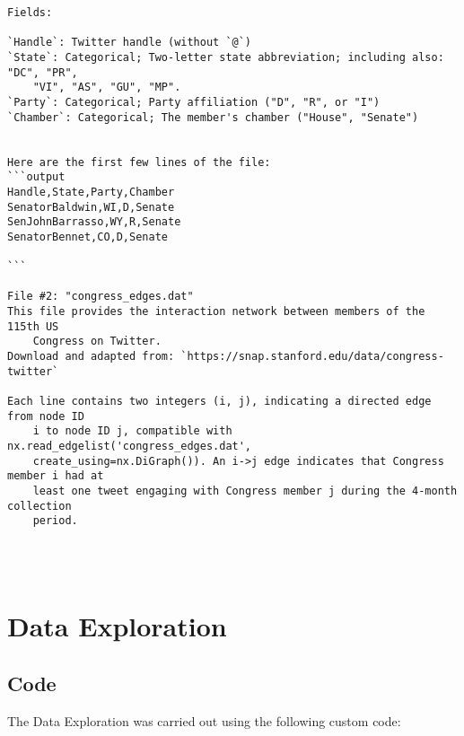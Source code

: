 \documentclass[11pt]{article}
\begin{document}
\begin{Verbatim}[tabsize=4]
Fields:

`Handle`: Twitter handle (without `@`)
`State`: Categorical; Two-letter state abbreviation; including also: "DC", "PR",
	"VI", "AS", "GU", "MP".
`Party`: Categorical; Party affiliation ("D", "R", or "I")
`Chamber`: Categorical; The member's chamber ("House", "Senate")


Here are the first few lines of the file:
```output
Handle,State,Party,Chamber
SenatorBaldwin,WI,D,Senate
SenJohnBarrasso,WY,R,Senate
SenatorBennet,CO,D,Senate

```

File #2: "congress_edges.dat"
This file provides the interaction network between members of the 115th US
	Congress on Twitter.
Download and adapted from: `https://snap.stanford.edu/data/congress-twitter`

Each line contains two integers (i, j), indicating a directed edge from node ID
	i to node ID j, compatible with nx.read_edgelist('congress_edges.dat',
	create_using=nx.DiGraph()). An i->j edge indicates that Congress member i had at
	least one tweet engaging with Congress member j during the 4-month collection
	period.




\end{Verbatim}

\section{Data Exploration}
\subsection{{Code}}
The Data Exploration was carried out using the following custom code:
\end{document}
